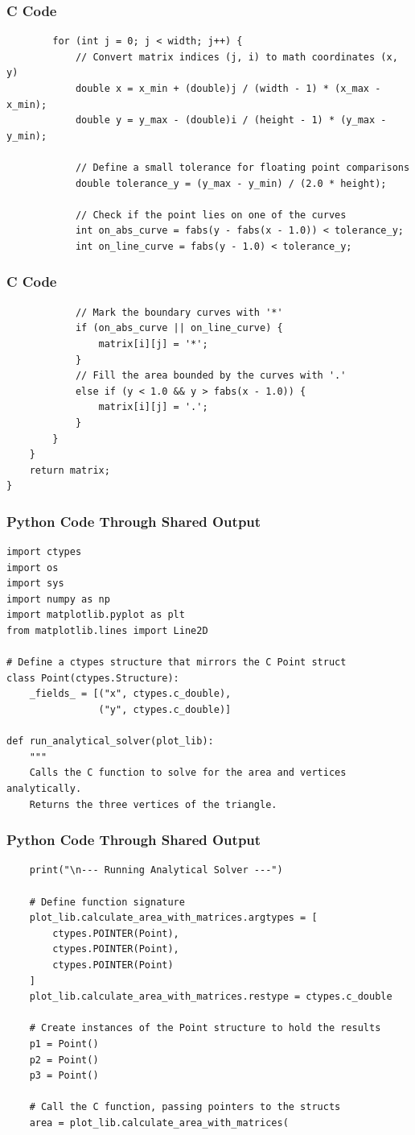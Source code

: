 \documentclass{beamer}
\begin{document}
\begin{frame}[fragile]
\frametitle{C Code }
\begin{lstlisting}
        for (int j = 0; j < width; j++) {
            // Convert matrix indices (j, i) to math coordinates (x, y)
            double x = x_min + (double)j / (width - 1) * (x_max - x_min);
            double y = y_max - (double)i / (height - 1) * (y_max - y_min);

            // Define a small tolerance for floating point comparisons
            double tolerance_y = (y_max - y_min) / (2.0 * height);

            // Check if the point lies on one of the curves
            int on_abs_curve = fabs(y - fabs(x - 1.0)) < tolerance_y;
            int on_line_curve = fabs(y - 1.0) < tolerance_y;
\end{lstlisting}    
\end{frame}
\begin{frame}[fragile]
\frametitle{C Code }
\begin{lstlisting}
            // Mark the boundary curves with '*'
            if (on_abs_curve || on_line_curve) {
                matrix[i][j] = '*';
            }
            // Fill the area bounded by the curves with '.'
            else if (y < 1.0 && y > fabs(x - 1.0)) {
                matrix[i][j] = '.';
            }
        }
    }
    return matrix;
}
\end{lstlisting}    
\end{frame}
\begin{frame}[fragile]
\frametitle{Python Code Through Shared Output }
\begin{lstlisting}
import ctypes
import os
import sys
import numpy as np
import matplotlib.pyplot as plt
from matplotlib.lines import Line2D

# Define a ctypes structure that mirrors the C Point struct
class Point(ctypes.Structure):
    _fields_ = [("x", ctypes.c_double),
                ("y", ctypes.c_double)]

def run_analytical_solver(plot_lib):
    """
    Calls the C function to solve for the area and vertices analytically.
    Returns the three vertices of the triangle.
\end{lstlisting}    
\end{frame}
\begin{frame}[fragile]
\frametitle{Python Code Through Shared Output }
\begin{lstlisting}
    print("\n--- Running Analytical Solver ---")
    
    # Define function signature
    plot_lib.calculate_area_with_matrices.argtypes = [
        ctypes.POINTER(Point),
        ctypes.POINTER(Point),
        ctypes.POINTER(Point)
    ]
    plot_lib.calculate_area_with_matrices.restype = ctypes.c_double

    # Create instances of the Point structure to hold the results
    p1 = Point()
    p2 = Point()
    p3 = Point()

    # Call the C function, passing pointers to the structs
    area = plot_lib.calculate_area_with_matrices(
    \end{lstlisting}    
\end{frame}
\end{document}
